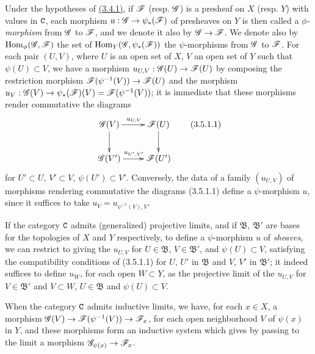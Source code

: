 \begin{env}[3.5.1]
\label{0.3.5.1}
Under the hypotheses of \hyperref[0.3.4.1]{(3.4.1)}, if $\mathscr{F}$ (resp. $\mathscr{G}$) is a
presheaf on $X$ (resp. $Y$) with values in $\mathtt{C}$, each morphism
$u:\mathscr{G}\to\psi_*(\mathscr{F})$ of presheaves on $Y$ is then called a
{\em $\phi$-morphism} from $\mathscr{G}$ to $\mathscr{F}$, and we denote it also by
$\mathscr{G}\to\mathscr{F}$. We denote also by ${\mathop{\mathrm{Hom}}\nolimits}_\phi(\mathscr{G},\mathscr{F})$ the set of
${\mathop{\mathrm{Hom}}\nolimits}_Y(\mathscr{G},\psi_*(\mathscr{F}))$ the $\psi$-morphisms from $\mathscr{G}$ to $\mathscr{F}$.
For each pair $(U,V)$, where $U$ is an open set of $X$, $V$ an open set of $Y$
such that $\psi(U)\subset V$, we have a morphism $u_{U,V}:\mathscr{G}(U)\to\mathscr{F}(U)$
by composing the restriction morphism $\mathscr{F}(\psi^{-1}(V))\to\mathscr{F}(U)$ and the
morphism $u_V:\mathscr{G}(V)\to\psi_*(\mathscr{F})(V)=\mathscr{F}(\psi^{-1}(V))$; it is
immediate that these morphisms render commutative the diagrams
\[
  \xymatrix{
    \sh{G}(V)\ar[r]^{u_{U,V}}\ar[d] &
    \sh{F}(U)\ar[d]\\
    \sh{G}(V')\ar[r]^{u_{U',V'}} &
    \sh{F}(U')
  }
  \tag{3.5.1.1}
\]
for $U'\subset U$, $V'\subset V$, $\psi(U')\subset V'$. Conversely, the data of
a family $(u_{U,V})$ of morphisms rendering commutative the diagrams (3.5.1.1)
define a $\psi$-morphism $u$, since it suffices to take
$u_V=u_{\psi^{-1}(V),V}$.

If the category $\mathtt{C}$ admits (generalized) projective limits, and if
$\mathfrak{B}$, $\mathfrak{B}'$ are bases for the topologies of $X$ and $Y$
respectively, to define a $\psi$-morphism $u$ of {\em sheaves}, we can restrict
to giving the $u_{U,V}$ for $U\in\mathfrak{B}$, $V\in\mathfrak{B}'$, and
$\psi(U)\subset V$, satisfying the compatibility conditions of (3.5.1.1) for
$U$, $U'$ in $\mathfrak{B}$ and $V$, $V'$ in $\mathfrak{B}'$; it indeed suffices
to define $u_W$, for each open $W\subset Y$, as the projective limit of the
$u_{U,V}$ for $V\in\mathfrak{B}'$ and $V\subset W$, $U\in\mathfrak{B}$ and
$\psi(U)\subset V$.

When the category $\mathtt{C}$ admits inductive limits, we have, for each $x\in X$, a
morphism $\mathscr{G}(V)\to\mathscr{F}(\psi^{-1}(V))\to\mathscr{F}_x$, for each open
neighborhood $V$ of $\psi(x)$ in $Y$, and these morphisms form an inductive
system which gives by passing to the limit a morphism
$\mathscr{G}_{\psi(x)}\to\mathscr{F}_x$.
\end{env}

